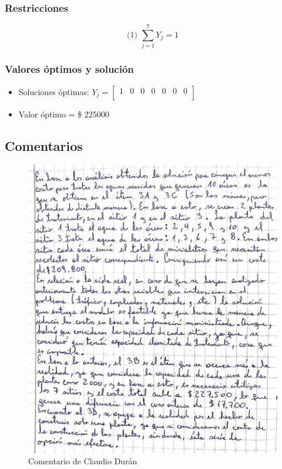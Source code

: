 \documentclass[a4paper,12pt]{article}
\begin{document}
\subsubsection{Restricciones}
\begin{equation*}
	\text{(1) }\sum_{j=1}^{7}Y_j=1
\end{equation*}
\subsubsection{Valores óptimos y solución}
\begin{itemize}
	\item Soluciones óptimas:
	$Y_{j}=
	\begin{bmatrix}
	1 & 0 & 0 & 0 & 0 & 0 & 0\\
	\end{bmatrix}$
	\item Valor óptimo = \$ 225000
\end{itemize}
\newpage
\subsection{Comentarios}
\begin{figure}[H]
	\centering
	\includegraphics[scale=0.55]{claudio3.jpg}
	\caption*{Comentario de Claudio Durán}
\end{figure}
\end{document}
